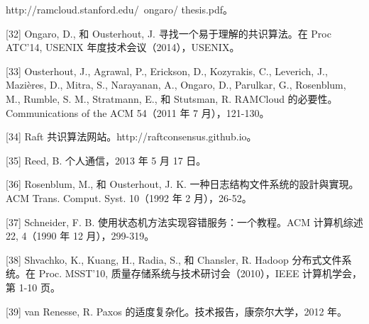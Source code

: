 \documentclass[12pt,a4paper]{report} %
\begin{document}
http://ramcloud.stanford.edu/~ongaro/ thesis.pdf。

[32] Ongaro, D., 和 Ousterhout, J. 寻找一个易于理解的共识算法。在 Proc ATC'14, USENIX 年度技术会议（2014），USENIX。

[33] Ousterhout, J., Agrawal, P., Erickson, D., Kozyrakis, C., Leverich, J., Mazières, D., Mitra, S., Narayanan, A., Ongaro, D., Parulkar, G., Rosenblum, M., Rumble, S. M., Stratmann, E., 和 Stutsman, R. RAMCloud 的必要性。Communications of the ACM 54（2011 年 7 月），121-130。

[34] Raft 共识算法网站。http://raftconsensus.github.io。

[35] Reed, B. 个人通信，2013 年 5 月 17 日。

[36] Rosenblum, M., 和 Ousterhout, J. K. 一种日志结构文件系统的設計與實現。ACM Trans. Comput. Syst. 10（1992 年 2 月），26-52。

[37] Schneider, F. B. 使用状态机方法实现容错服务：一个教程。ACM 计算机综述 22, 4（1990 年 12 月），299-319。

[38] Shvachko, K., Kuang, H., Radia, S., 和 Chansler, R. Hadoop 分布式文件系统。在 Proc. MSST'10, 质量存储系统与技术研讨会（2010），IEEE 计算机学会，第 1-10 页。

[39] van Renesse, R. Paxos 的适度复杂化。技术报告，康奈尔大学，2012 年。

\end{document}
